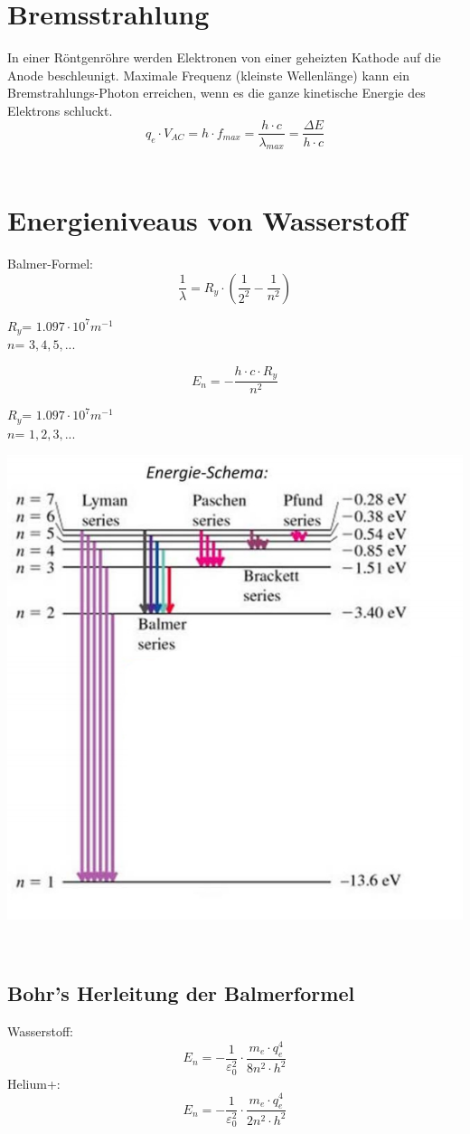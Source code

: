 \section{Bremsstrahlung}
In einer Röntgenröhre werden Elektronen von einer geheizten  Kathode auf die Anode beschleunigt. Maximale Frequenz (kleinste Wellenlänge) kann ein Bremstrahlungs-Photon erreichen, wenn es die ganze kinetische Energie des Elektrons schluckt.\
\[
	q_e\cdot V_{AC} = h\cdot f_{max} = \frac{h\cdot c}{\lambda_{max}}=\frac{\Delta E}{h\cdot c}
\]
\\
\section{Energieniveaus von Wasserstoff}
Balmer-Formel:
\[
	\frac{1}{\lambda}=R_y\cdot \left( \frac{1}{2^2} - \frac{1}{n^2}\right) 
\]
\begin{footnotesize}
	$R_y$=	$1.097\cdot 10^7 m^{-1}$\\
	$n$=	$3,4,5,...$ \\
\end{footnotesize}
\[
	E_n= -\frac{h\cdot c \cdot R_y}{n^2}
\]
\begin{footnotesize}
	$R_y$=	$1.097\cdot 10^7 m^{-1}$\\
	$n$=	$1,2,3,...$ \\
\end{footnotesize}
\begin{center}
	\includegraphics[scale = 0.25]{images/en_H.jpg}
\end{center}
\
\subsection{Bohr's Herleitung der Balmerformel}
Wasserstoff:
\[
	E_n= - \frac{1}{\varepsilon_0^2}\cdot\frac{m_e\cdot q_e^4}{8n^2\cdot h^2}
\]
Helium+:
\[
	E_n= - \frac{1}{\varepsilon_0^2}\cdot\frac{m_e\cdot q_e^4}{2n^2\cdot h^2}
\]



